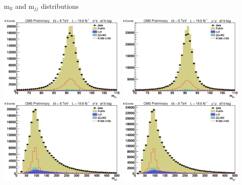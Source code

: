 \begin{frame}{m$_{ll}$ and m$_{jj}$ distributions}
\begin{center}
\includegraphics[width=0.47\textwidth]{images/preselection/el/mLL.eps}
\includegraphics[width=0.47\textwidth]{images/preselection/mu/mLL.eps}\\
\includegraphics[width=0.47\textwidth]{images/preselection/el/mJJ.eps}
\includegraphics[width=0.47\textwidth]{images/preselection/mu/mJJ.eps}\\
\end{center}
\end{frame}



